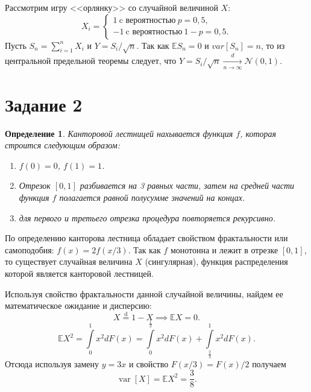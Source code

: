 \documentclass[12pt, a4paper]{article} %
\newcommand\Eqtext[1]{\mathrel{\stackrel{\mathrm{\text{#1}}}=}}
\def\Expec{\mathbb{E}} %
\def\Norm{\mathcal{N}} %
\DeclareMathOperator{\var}{var}
\newtheorem{Def}{Определение}
\begin{document}
Рассмотрим игру <<орлянку>> со случайной величиной $X$:
\[
    X_i =
    \begin{cases}
        1\ \text{c вероятностью}\ p = 0{,}5, \\
        -1\ \text{c вероятностью}\ 1 - p = 0{,}5.
    \end{cases} 
\] 
Пусть  $S_n = \sum\limits_{i=1}^{n} X_i$ и $Y = S_i /\!\sqrt{n}$.
Так как $\Expec S_n = 0$ и  $var[S_n] = n$, то из центральной предельной теоремы следует,
что $Y = S_i /\!\sqrt{n} \xrightarrow[n \rightarrow \infty]{d}  \Norm(0, 1)$.

\section*{Задание 2}

\begin{Def}
    Канторовой лестницей нахывается функция $f$, которая строится следующим образом:
    \begin{enumerate}
        \item $f(0) = 0$,  $f(1) = 1$.
        \item Отрезок  $[0, 1]$ разбивается на 3 равных части, затем на 
            средней части функция  $f$ полагается равной полусумме значений на концах.
        \item для первого и третьего отрезка процедура повторяется рекурсивно.
    \end{enumerate} 
\end{Def} 

По определению канторова лестница обладает свойством фрактальности или самоподобия:
$f(x) = 2f(x / 3)$.
Так как  $f$ монотонна и лежит в отрезке  $[0, 1]$, то существует 
случайная величина $X$ (сингулярная), функция распределения которой является канторовой лестницей.

Используя свойство фрактальности данной случайной величины, найдем ее математическое ожидание и дисперсию:
\[
    X \Eqtext{d} 1 - X \implies \Expec X = 0.
\] 
\begin{equation*}
    \Expec X^2 = \int\limits_{0}^{1} x^2 dF(x) = 
    \int\limits_{0}^{\frac{1}{3}} x^2 dF(x) +
    \int\limits_{\frac{2}{3}}^{1}  x^2 dF(x).    
\end{equation*}
Отсюда используя замену $y = 3x$ и свойство $F(x / 3) = F(x) / 2$ получаем 
 \[
     \var\left[ X \right] = \Expec X^2 = \frac{3}{8}.
\] 

\newpage



 
\end{document}
